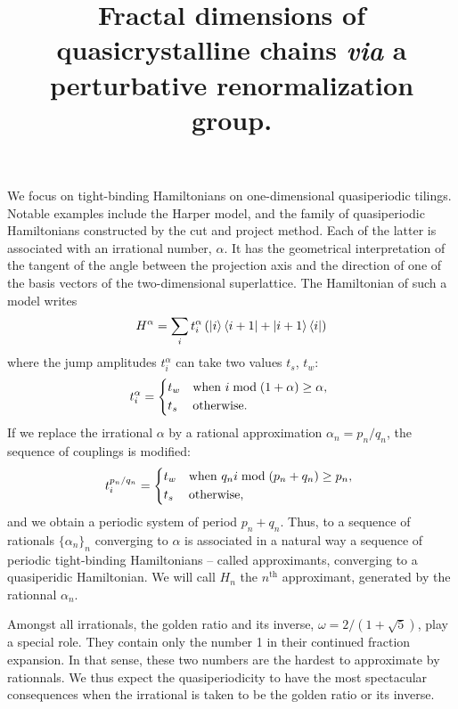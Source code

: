 \documentclass[11pt]{article}
\title{\textbf{Fractal dimensions of quasicrystalline chains \emph{via} a perturbative renormalization group.}}
\author{}
\date{}
\begin{document}

\maketitle


We focus on tight-binding Hamiltonians on one-dimensional quasiperiodic tilings.
Notable examples include the Harper model, and the family of quasiperiodic Hamiltonians constructed by the cut and project method. 
Each of the latter is associated with an irrational number, $\alpha$.
It has the geometrical interpretation of the tangent of the angle between the projection axis and the direction of one of the basis vectors of the two-dimensional superlattice.
The Hamiltonian of such a model writes
\begin{equation}
	H^\alpha = \sum_i t^\alpha_i \left( \ket{i} \bra{i+1} + \ket{i+1} \bra{i} \right)
\end{equation}
where the jump amplitudes $t^\alpha_i$ can take two values $t_s$, $t_w$:
\begin{equation}
	t_i^\alpha = \begin{dcases*}
	t_w & when $i \bmod(1+\alpha) \geq \alpha$, \\
	t_s & otherwise.
	\end{dcases*}
\end{equation}
If we replace the irrational $\alpha$ by a rational approximation $\alpha_n = p_n/q_n$, the sequence of couplings is modified:
\begin{equation}
	t_i^{p_n/q_n} = \begin{dcases*}
	t_w & when $q_n i \bmod(p_n+q_n) \geq p_n$, \\
	t_s & otherwise,
	\end{dcases*}
\end{equation}
and we obtain a periodic system of period $p_n + q_n$. 
Thus, to a sequence of rationals $\{\alpha_n\}_n$ converging to $\alpha$ is associated in a natural way a sequence of periodic tight-binding Hamiltonians -- called approximants, converging to a quasiperidic Hamiltonian. We will call $H_n$ the $n^\text{th}$ approximant, generated by the rationnal $\alpha_n$.


Amongst all irrationals, the golden ratio and its inverse, $\omega = 2/(1+\sqrt{5})$, play a special role. They contain only the number 1 in their continued fraction expansion. In that sense, these two numbers are the hardest to approximate by rationnals. 
We thus expect the quasiperiodicity to have the most spectacular consequences when the irrational is taken to be the golden ratio or its inverse.
\end{document}
